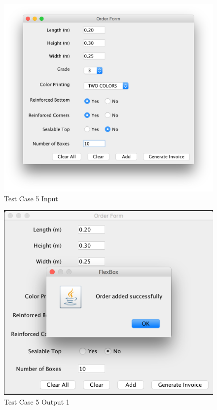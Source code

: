 \documentclass[12pt]{article}
\begin{document}
\begin{figure}[H]
	\includegraphics[width=\linewidth]{./screenshots/test_case_5_input.png}
	\caption{Test Case 5 Input}
	\label{test_case_5_input}
\end{figure}
\begin{figure}[H]
	\includegraphics[width=\linewidth]{./screenshots/test_case_5_output_1.png}
	\caption{Test Case 5 Output 1}
	\label{test_case_5_output}
\end{figure}
\end{document}

